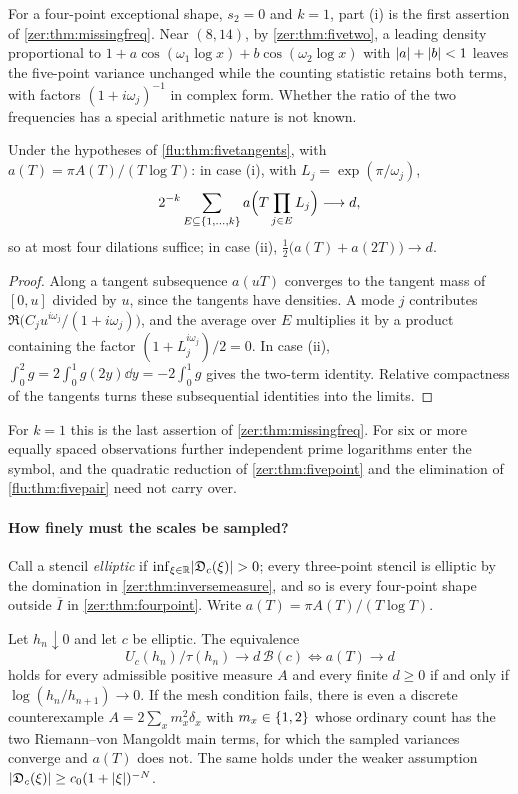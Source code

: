 For a four-point exceptional shape, $s_2=0$ and $k=1$, part (i) is the first assertion of
\cref{zer:thm:missingfreq}. Near $(8,14)$, by \cref{zer:thm:fivetwo}, a leading density proportional to
$1+a\cos(\omega_1\log x)+b\cos(\omega_2\log x)$ with $\lvert a\rvert+\lvert b\rvert<1$ leaves the five-point variance unchanged while the
counting statistic retains both terms, with factors $(1+i\omega_j)^{-1}$ in complex form. Whether the ratio of
the two frequencies has a special arithmetic nature is not known.

\begin{corollary}\label{flu:cor:fiverepair}
Under the hypotheses of \cref{flu:thm:fivetangents}, with $a(T)=\pi A(T)/(T\log T)$: in case (i), with
$L_j=\exp(\pi/\omega_j)$,
\[
 2^{-k}\sum_{E\subseteq\{1,\dots,k\}}a\Bigl(T\prod_{j\in E}L_j\Bigr)\longrightarrow d,
\]
so at most four dilations suffice; in case (ii), $\tfrac12\bigl(a(T)+a(2T)\bigr)\to d$.
\end{corollary}
\begin{proof}
Along a tangent subsequence $a(uT)$ converges to the tangent mass of $[0,u]$ divided by $u$, since the tangents
have densities. A mode $j$ contributes $\Re\bigl(C_ju^{i\omega_j}/(1+i\omega_j)\bigr)$, and the average over $E$
multiplies it by a product containing the factor $(1+L_j^{i\omega_j})/2=0$. In case (ii),
$\int_0^2g=2\int_0^1g(2y)\dd y=-2\int_0^1g$ gives the two-term identity. Relative compactness of the tangents
turns these subsequential identities into the limits.
\end{proof}

For $k=1$ this is the last assertion of \cref{zer:thm:missingfreq}. For six or more equally spaced observations
further independent prime logarithms enter the symbol, and the quadratic reduction of
\cref{zer:thm:fivepoint} and the elimination of \cref{flu:thm:fivepair} need not carry over.

\paragraph{How finely must the scales be sampled?}
Call a stencil \emph{elliptic} if $\inf_{\xi\in\mathbb{R}}\lvert\mathfrak{D}_c(\xi)\rvert>0$; every three-point stencil is elliptic
by the domination in \cref{zer:thm:inversemeasure}, and so is every four-point shape outside $\overline I$ in
\cref{zer:thm:fourpoint}. Write $a(T)=\pi A(T)/(T\log T)$.

\begin{theorem}\label{zer:thm:mesh}
Let $h_n\downarrow0$ and let $c$ be elliptic. The equivalence
\[
 U_c(h_n)/\tau(h_n)\to d\,\mathcal B(c)\iff a(T)\to d
\]
holds for every admissible positive measure $A$ and every finite $d\ge0$ if and only if
$\log(h_n/h_{n+1})\to0$. If the mesh condition fails, there is even a discrete counterexample
$A=2\sum_xm_x^2\delta_x$ with $m_x\in\{1,2\}$ whose ordinary count has the two Riemann--von Mangoldt main
terms, for which the sampled variances converge and $a(T)$ does not. The same holds under the weaker
assumption $\lvert\mathfrak{D}_c(\xi)\rvert\ge c_0(1+\lvert\xi\rvert)^{-N}$.
\end{theorem}

